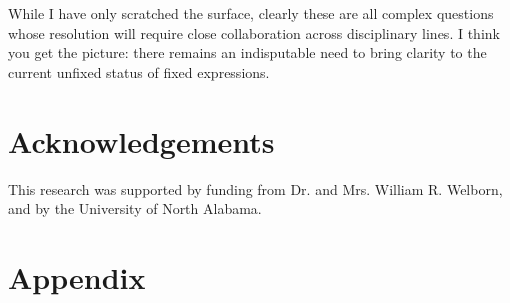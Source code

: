 \documentclass[english,output=paper,colorlinks,citecolor=brown]{../langscibook}
\begin{document}
While I have only scratched the surface, clearly these are all complex questions whose resolution will require close collaboration across disciplinary lines. I think you get the picture: there remains an indisputable need to bring clarity to the current unfixed status of fixed expressions.

\section*{Acknowledgements}
This research was supported by funding from Dr. and Mrs. William R. Welborn, and by the University of North Alabama.

\clearpage
\newcommand{\tablevspacex}{\\[-1em]}

\section*{Appendix} \largerpage[3]
\largerpage[4]
\end{document}

